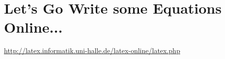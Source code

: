 \documentclass{article}
\begin{document}
\section{Let's Go Write some Equations Online...}

\url{http://latex.informatik.uni-halle.de/latex-online/latex.php}


%
%
\end{document}
